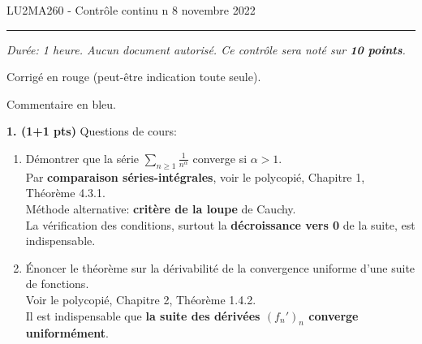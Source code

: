 \documentclass[a4paper,10pt]{article}
\newcommand{\R}{\mathbb{R}}
\newcommand{\correction}[1]{{\color{red}#1}}
\newcommand{\comment}[1]{{\color{blue}#1}}
\begin{document}
\noindent LU2MA260 - Contrôle continu n
\hfill 8 novembre 2022
\medskip\hrule
\vspace{.3in}

\emph{Durée: 1 heure. Aucun document autorisé.
Ce contrôle sera noté sur \textbf{10 points}.}

\correction{Corrigé en rouge (peut-être indication toute seule).}

\comment{Commentaire en bleu.}

\vspace{.1in}

\noindent
\textbf{1. (1+1 pts)} Questions de cours:

\begin{enumerate}[label=\alph*)]
    \item Démontrer que la série $\sum_{n\geq1}\frac{1}{n^\alpha}$ converge si $\alpha>1$.\\
    \correction{Par \textbf{comparaison séries-intégrales}, voir le polycopié, Chapitre 1, Théorème 4.3.1.}\\
    \comment{Méthode alternative: \textbf{critère de la loupe} de Cauchy.\\
    La vérification des conditions, surtout la \textbf{décroissance vers 0} de la suite, est indispensable.}
    \item Énoncer le théorème sur la dérivabilité de la convergence uniforme d'une suite de fonctions.\\
    \correction{Voir le polycopié, Chapitre 2, Théorème 1.4.2.}\\
    \comment{Il est indispensable que \textbf{la suite des dérivées $(f_n')_n$ converge uniformément}.}
\end{enumerate}



\end{document}
